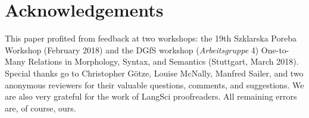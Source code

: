 \documentclass[output=paper]{langsci/langscibook}
\begin{document}
\section*{Acknowledgements}

This paper profited from feedback at two workshops: the 19th Szklarska Poreba Workshop (February 2018) and the DGfS workshop  (\textit{Arbeitsgruppe} 4) One-to-Many Relations in Morphology, Syntax, and Semantics (Stuttgart, March 2018). Special thanks go to Christopher G\"otze, Louise McNally, Manfred Sailer, and two anonymous reviewers for their valuable questions, comments, and suggestions. We are also very grateful for the work of LangSci  proofreaders. All remaining errors are, of course, ours.



{\sloppy
\printbibliography[heading=subbibliography,notkeyword=this]
}
\end{document}
